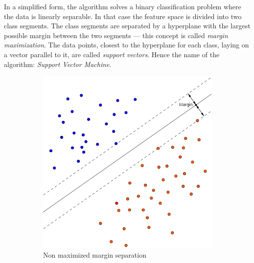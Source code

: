 In a simplified form, the algorithm solves a binary classification problem where the data is linearly separable. In that case the feature space is divided into two class segments. The class segments are separated by a hyperplane with the largest possible margin between the two segments --- this concept is called \textit{margin maximization}. The data points, closest to the hyperplane for each class, laying on a vector parallel to it, are called \textit{support vectors}. Hence the name of the algorithm: \textit{Support Vector Machine}. \\

\begin{figure}[t]
    \centering
    \begin{subfigure}[b]{0.45\textwidth}
        \includegraphics[width=\textwidth]{./figs/non_svm_classification_illustration}
        \caption{Non maximized margin separation}
        \label{fig:non_maximized_margin}
    \end{subfigure}
    \begin{subfigure}[b]{0.45\textwidth}

\end{subfigure}
\end{figure}
